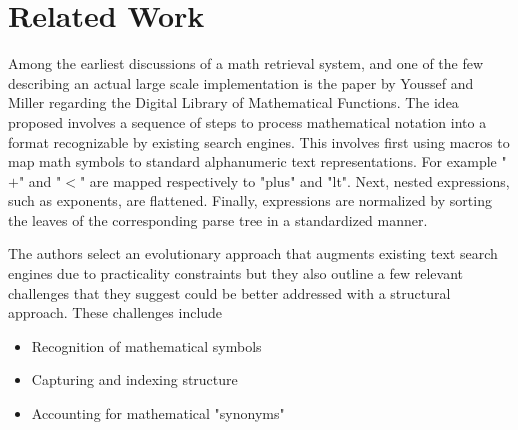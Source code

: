 \documentclass{sig-alternate}
\begin{document}
\section{Related Work}
Among the earliest discussions of a math retrieval system, and
one of the few describing an actual large scale implementation
is the paper by Youssef and Miller regarding the Digital Library
of Mathematical Functions\cite{youssef:library}. The idea proposed involves
a sequence of steps to process mathematical notation into a format
recognizable by existing search engines.
This involves first using macros to map math symbols to standard alphanumeric text representations.
For example "$+$" and "$<$" are mapped respectively to "plus" and "lt".
Next, nested expressions, such as exponents, are flattened. Finally,
expressions are normalized by sorting the leaves of the corresponding
parse tree in a standardized manner. 

The authors select an evolutionary approach that augments 
existing text search engines due to practicality constraints
but they also outline a few relevant challenges that they suggest
could be better addressed with a structural approach. These challenges
include 
\begin{itemize}
	\item Recognition of mathematical symbols
	\item Capturing and indexing structure
	\item Accounting for mathematical "synonyms"
\end{itemize}
\end{document}
